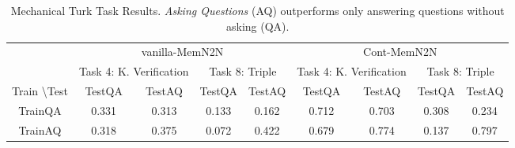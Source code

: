 \begin{table}[t!]
\centering
\scriptsize
\begin{tabular}{ccccccccc}\toprule
&\multicolumn{4}{c}{vanilla-MemN2N}&\multicolumn{4}{c}{Cont-MemN2N} \\\cmidrule{2-5}\cmidrule{6-9}
&\multicolumn{2}{c}{Task 4: K. Verification}&\multicolumn{2}{c}{Task 8: Triple}
&\multicolumn{2}{c}{Task 4: K. Verification}&\multicolumn{2}{c}{Task 8: Triple}  \\\cmidrule{2-3}\cmidrule{4-5}\cmidrule{6-7}\cmidrule{8-9}
Train \textbackslash Test &TestQA&TestAQ &TestQA&TestAQ &TestQA&TestAQ &TestQA&TestAQ\\\midrule
TrainQA & 0.331 & 0.313  & 0.133 & 0.162 & 0.712  & 0.703  & 0.308 & 0.234\\
TrainAQ & 0.318 & 0.375  & 0.072 & 0.422 & 0.679  & 0.774  & 0.137 & 0.797 \\\bottomrule
\end{tabular}
\caption{Mechanical Turk Task Results. {\it Asking Questions} (AQ) outperforms only 
answering questions without asking (QA).
\label{res:mturk-mainy}}
\end{table}



